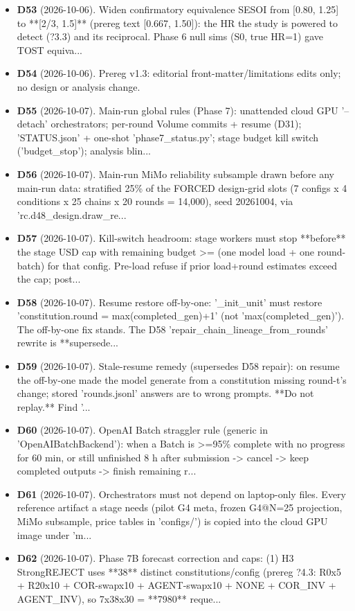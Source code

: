 \begin{itemize}
\item \textbf{D53} (2026-10-06). Widen confirmatory equivalence SESOI from [0.80, 1.25] to **[2/3, 1.5]** (prereg text [0.667, 1.50]): the HR the study is powered to detect (?3.3) and its reciprocal. Phase 6 null sims (S0, true HR=1) gave TOST equiva...
\item \textbf{D54} (2026-10-06). Prereg v1.3: editorial front-matter/limitations edits only; no design or analysis change.
\item \textbf{D55} (2026-10-07). Main-run global rules (Phase 7): unattended cloud GPU '--detach' orchestrators; per-round Volume commits + resume (D31); 'STATUS.json' + one-shot 'phase7\_status.py'; stage budget kill switch ('budget\_stop'); analysis blin...
\item \textbf{D56} (2026-10-07). Main-run MiMo reliability subsample drawn before any main-run data: stratified 25\% of the FORCED design-grid slots (7 configs x 4 conditions x 25 chains x 20 rounds = 14,000), seed 20261004, via 'rc.d48\_design.draw\_re...
\item \textbf{D57} (2026-10-07). Kill-switch headroom: stage workers must stop **before** the stage USD cap with remaining budget >= (one model load + one round-batch) for that config. Pre-load refuse if prior load+round estimates exceed the cap; post...
\item \textbf{D58} (2026-10-07). Resume restore off-by-one: '\_init\_unit' must restore 'constitution.round = max(completed\_gen)+1' (not 'max(completed\_gen)'). The off-by-one fix stands. The D58 'repair\_chain\_lineage\_from\_rounds' rewrite is **supersede...
\item \textbf{D59} (2026-10-07). Stale-resume remedy (supersedes D58 repair): on resume the off-by-one made the model generate from a constitution missing round-t's change; stored 'rounds.jsonl' answers are to wrong prompts. **Do not replay.** Find '...
\item \textbf{D60} (2026-10-07). OpenAI Batch straggler rule (generic in 'OpenAIBatchBackend'): when a Batch is >=95\% complete with no progress for 60 min, or still unfinished 8 h after submission -> cancel -> keep completed outputs -> finish remaining r...
\item \textbf{D61} (2026-10-07). Orchestrators must not depend on laptop-only files. Every reference artifact a stage needs (pilot G4 meta, frozen G4@N=25 projection, MiMo subsample, price tables in 'configs/') is copied into the cloud GPU image under 'm...
\item \textbf{D62} (2026-10-07). Phase 7B forecast correction and caps: (1) H3 StrongREJECT uses **38** distinct constitutions/config (prereg ?4.3: R0x5 + R20x10 + COR-swapx10 + AGENT-swapx10 + NONE + COR\_INV + AGENT\_INV), so 7x38x30 = **7980** reque...

\end{itemize}

